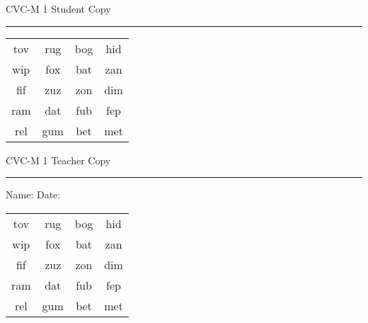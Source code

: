 \documentclass{memoir}
\begin{document}

\footnotesize \noindent
CVC-M 1 \hfill Student Copy
\smallskip
\hrule

\Large

\setlength{\tabcolsep}{14pt}
\def\arraystretch{2}

{\selectfont


\begin{vplace}[0.5]
\begin{center}
\begin{tabular}{cccc}
tov & rug & bog & hid \\
wip & fox & bat & zan \\
fif & zuz & zon & dim \\
ram & dat & fub & fep \\
rel & gum  & bet & met \\
\end{tabular}
\end{center}
\end{vplace}

}

\newpage

\footnotesize \noindent
CVC-M 1 \hfill Teacher Copy
\smallskip
\hrule

\small

\vfill

\noindent
Name: \underline{\hspace{1.75in}} \hfill Date: \underline{\hspace{1in}}

\Large

{\selectfont


\begin{vplace}[0.5]
\begin{center}
\begin{tabular}{cccc}
tov & rug & bog & hid \\
wip & fox & bat & zan \\
fif & zuz & zon & dim \\
ram & dat & fub & fep \\
rel & gum  & bet & met \\
\end{tabular}
\end{center}
\end{vplace}



}
\end{document}
